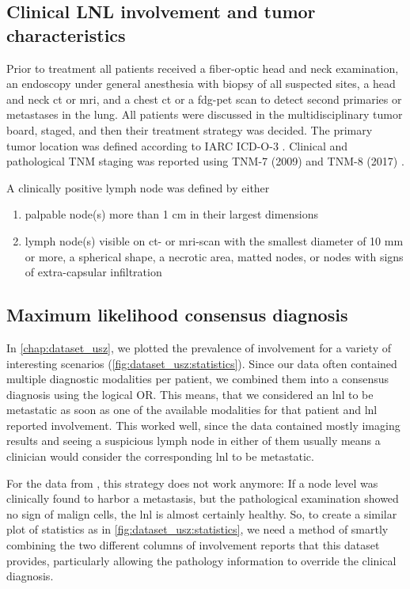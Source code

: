 \documentclass[\relativeRoot/main.tex]{subfiles}
\begin{document}
\subsection*{Clinical LNL involvement and tumor characteristics}
\label{subsec:dataset_clb:methods:involvement}

Prior to treatment all patients received a fiber-optic head and neck examination, an endoscopy under general anesthesia with biopsy of all suspected sites, a head and neck \gls{ct} or \gls{mri}, and a chest \gls{ct} or a \gls{fdg-pet} scan to detect second primaries or metastases in the lung. All patients were discussed in the multidisciplinary tumor board, staged, and then their treatment strategy was decided. The primary tumor location was defined according to IARC ICD-O-3 \cite{fritz_international_2000}. Clinical and pathological TNM staging was reported using TNM-7 (2009) and TNM-8 (2017) \cite{brierley_tnm_2017}.

A clinically positive lymph node was defined by either

\begin{enumerate}[label={\alph*)}]
    \item palpable node(s) more than 1 cm in their largest dimensions
    \item lymph node(s) visible on \gls{ct}- or \gls{mri}-scan with the smallest diameter of 10 mm or more, a spherical shape, a necrotic area, matted nodes, or nodes with signs of extra-capsular infiltration
\end{enumerate}

\subsection*{Maximum likelihood consensus diagnosis}
\label{subsec:dataset_clb:methods:max_llh}

In \cref{chap:dataset_usz}, we plotted the prevalence of involvement for a variety of interesting scenarios (\cref{fig:dataset_usz:statistics}). Since our data often contained multiple diagnostic modalities per patient, we combined them into a consensus diagnosis using the logical OR. This means, that we considered an \gls{lnl} to be metastatic as soon as one of the available modalities for that patient and \gls{lnl} reported involvement. This worked well, since the data contained mostly imaging results and seeing a suspicious lymph node in either of them usually means a clinician would consider the corresponding \gls{lnl} to be metastatic.

For the data from , this strategy does not work anymore: If a node level was clinically found to harbor a metastasis, but the pathological examination showed no sign of malign cells, the \gls{lnl} is almost certainly healthy. So, to create a similar plot of statistics as in \cref{fig:dataset_usz:statistics}, we need a method of smartly combining the two different columns of involvement reports that this dataset provides, particularly allowing the pathology information to override the clinical diagnosis.
\end{document}
